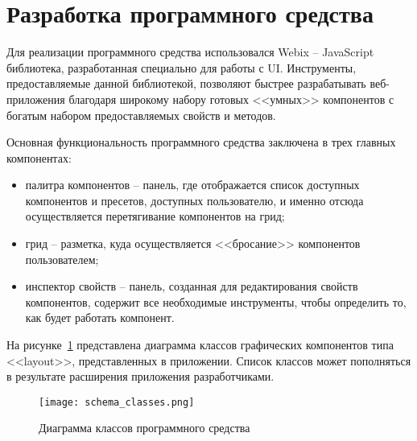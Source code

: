 \section{Разработка программного средства} 
\label{sec:development}

Для реализации программного средства использовался Webix -- JavaScript библиотека, разработанная специально для работы с UI. Инструменты, предоставляемые данной библиотекой, позволяют быстрее разрабатывать веб-приложения благодаря широкому набору готовых <<умных>> компонентов с богатым набором предоставляемых свойств и методов.

Основная функциональность программного средства заключена в трех главных компонентах: 
\begin{itemize}
	\item палитра компонентов -- панель, где отображается список доступных компонентов и пресетов, доступных пользователю, и именно отсюда осуществляется перетягивание компонентов на грид;
	\item грид -- разметка, куда осуществляется <<бросание>> компонентов пользователем;
	\item инспектор свойств -- панель, созданная для редактирования свойств компонентов, содержит все необходимые инструменты, чтобы определить то, как будет работать компонент.
\end{itemize}
  
На рисунке~\ref{sec:development:schema_classes} представлена диаграмма классов графических компонентов типа <<layout>>, представленных в приложении. Список классов может пополняться в результате расширения приложения разработчиками.\pagebreak

\begin{figure}[ht]
  \centering
    \texttt{[image: schema\_classes.png]}
    \caption{Диаграмма классов программного средства}
    \label{sec:development:schema_classes}
\end{figure}







